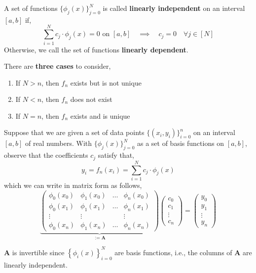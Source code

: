 \NewLine

\begin{defn}
    \sloppy A set of functions $\{\phi_j(x)\}_{j = 0}^N$ is called \textbf{linearly independent} on an interval $[a,b]$ if,
    \[\sum_{i=1}^N c_j \cdot \phi_j(x) = 0 \text{ on } [a,b] \quad \implies \quad c_j = 0  \quad \forall j \in [N]\]
    Otherwise, we call the set of functions \textbf{linearly dependent}.
\end{defn}

\NewLine

\noindent There are \textbf{three cases} to consider,
\begin{enumerate}
    \item If $N > n$, then $f_n$ exists but is not unique
    \item If $N < n$, then $f_n$ does not exist
    \item If $N = n$, then $f_n$ exists and is unique
\end{enumerate}

\noindent Suppose that we are given a set of data points $\{(x_i, y_i)\}_{i=0}^n$ on an interval $[a,b]$ of real numbers. With $\{\phi_j(x)\}_{j = 0}^N$ as a set of basis functions on $[a,b]$, observe that the coefficients $c_j$ satisfy that,
\[y_i = f_n(x_i) = \sum_{i=1}^N c_j \cdot \phi_j(x)\]
which we can write in matrix form as follows,
\[
\underbrace{\left(\begin{array}{cccc}
\phi_0\left(x_0\right) & \phi_1\left(x_0\right) & \ldots & \phi_n\left(x_0\right) \\
\phi_0\left(x_1\right) & \phi_1\left(x_1\right) & \ldots & \phi_n\left(x_1\right) \\
\vdots & \vdots & & \vdots \\
\phi_0\left(x_n\right) & \phi_1\left(x_n\right) & \ldots & \phi_n\left(x_n\right)
\end{array}\right)}_{:= \mathbf{A}}\left(\begin{array}{c}
c_0 \\
c_1 \\
\vdots \\
c_n
\end{array}\right)=\left(\begin{array}{c}
y_0 \\
y_1 \\
\vdots \\
y_n
\end{array}\right)
\]

\begin{rmk}
   $\mathbf{A}$ is invertible since $\left\{\phi_i(x)\right\}_{i=0}^N$ are basis functions, i.e., the columns of $\mathbf{A}$ are linearly independent.
\end{rmk}

